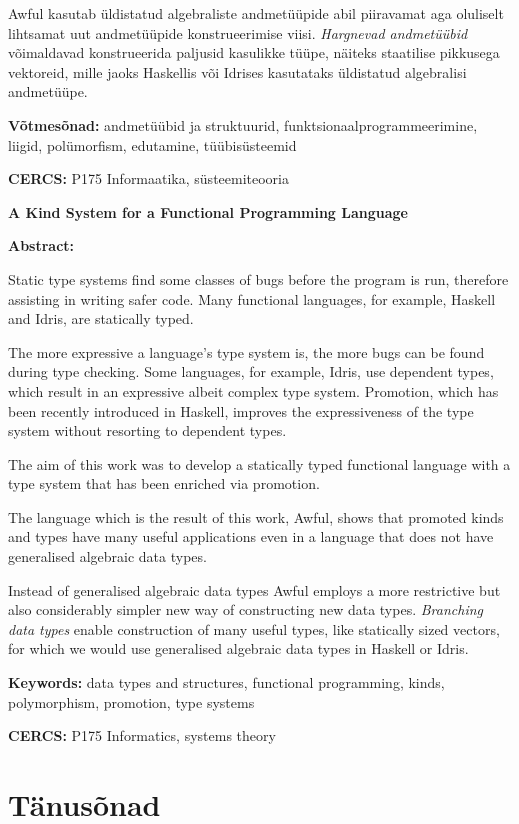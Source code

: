 \documentclass[12pt]{article}
\newcommand\peatykktarn[1]{
  \clearpage
  \section*{#1}
  \addcontentsline{toc}{section}{#1}}
\begin{document}
  Awful kasutab üldistatud algebraliste andmetüüpide abil piiravamat aga oluliselt lihtsamat uut andmetüüpide konstrueerimise viisi. \textit{Hargnevad andmetüübid} võimaldavad konstrueerida paljusid kasulikke tüüpe, näiteks staatilise pikkusega vektoreid, mille jaoks Haskellis või Idrises kasutataks üldistatud algebralisi andmetüüpe.

  \vspace*{1ex}

  \noindent
  \textbf{Võtmesõnad:} andmetüübid ja struktuurid, funktsionaalprogrammeerimine, liigid, polümorfism, edutamine, tüübisüsteemid

  \vspace*{1ex}

  \noindent
  \textbf{CERCS:} P175 Informaatika, süsteemiteooria

  \vspace*{3ex}

  {
    \noindent
    \textbf{\large A Kind System for a Functional Programming Language}

    \vspace*{1ex}

    \noindent
    \textbf{Abstract:}

    \noindent
    Static type systems find some classes of bugs before the program is run, therefore assisting in writing safer code. Many functional languages, for example, Haskell and Idris, are statically typed.

    The more expressive a language's type system is, the more bugs can be found during type checking. Some languages, for example, Idris, use dependent types, which result in an expressive albeit complex type system. Promotion, which has been recently introduced in Haskell, improves the expressiveness of the type system without resorting to dependent types.

    The aim of this work was to develop a statically typed functional language with a type system that has been enriched via promotion.

    The language which is the result of this work, Awful, shows that promoted kinds and types have many useful applications even in a language that does not have generalised algebraic data types.

    Instead of generalised algebraic data types Awful employs a more restrictive but also considerably simpler new way of constructing new data types. \textit{Branching data types} enable construction of many useful types, like statically sized vectors, for which we would use generalised algebraic data types in Haskell or Idris.

    \vspace*{1ex}

    \noindent
    \textbf{Keywords:} data types and structures, functional programming, kinds, polymorphism, promotion, type systems

    \vspace*{1ex}

    \noindent
    \textbf{CERCS:} P175 Informatics, systems theory

    \vspace*{1ex}}
  \newpage
  \tableofcontents
  \peatykktarn{Tänusõnad}
    
\end{document}
